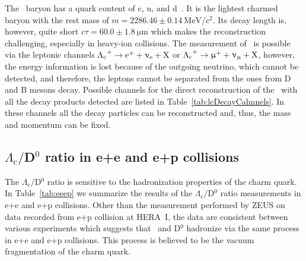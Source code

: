 The \Lambdac\ baryon has a quark content of c, u, and d~\cite{PDG}. It is the lightest charmed baryon with the rest mass of $m = 2286.46 \pm \SI{0.14}{\mega\electronvolt}/c^2$\@. Its decay length is, however, quite short $c\tau = 60.0 \pm \SI{1.8}{\micro\metre}$ which makes the reconstruction challenging, especially in heavy-ion collisions. The measurement of \Lambdac\ is possible via the leptonic channels ${\Lambda_\text{c}}^+ \rightarrow \mathrm{e}^+ + \upnu_\mathrm{e} + \mathrm{X}$ or ${\Lambda_\text{c}}^+ \rightarrow \upmu^+ + \upnu_\upmu + \mathrm{X}$, however, the energy information is lost because of the outgoing neutrino, which cannot be detected, and therefore, the leptons cannot be separated from the ones from D and B mesons decay. Possible channels for the direct reconstruction of the \Lambdac\ with all the decay products detected are listed in Table~\ref{tab:lcDecayCahnnels}. In these channels all the decay particles can be reconstructed and, thus, the mass and momentum can be fixed.

\subsection{$\Lambda_\mathrm{c}/$D$^0$ ratio in e+e and e+p collisions}

The $\Lambda_\mathrm{c}/$D$^0$ ratio is sensitive to the hadronization properties of the charm quark. In Table~\ref{tab:eeep} we summarize the results of the $\Lambda_\mathrm{c}/$D$^0$ ratio measurements in e+e and e+p collisions. Other than the measurement performed by ZEUS on data recorded from e+p collision at HERA~I, the data are consistent between various experiments which suggests that \Lambdac\ and D$^0$ hadronize via the same process in e+e and e+p collisions. This process is believed to be the vacuum fragmentation of the charm quark.

